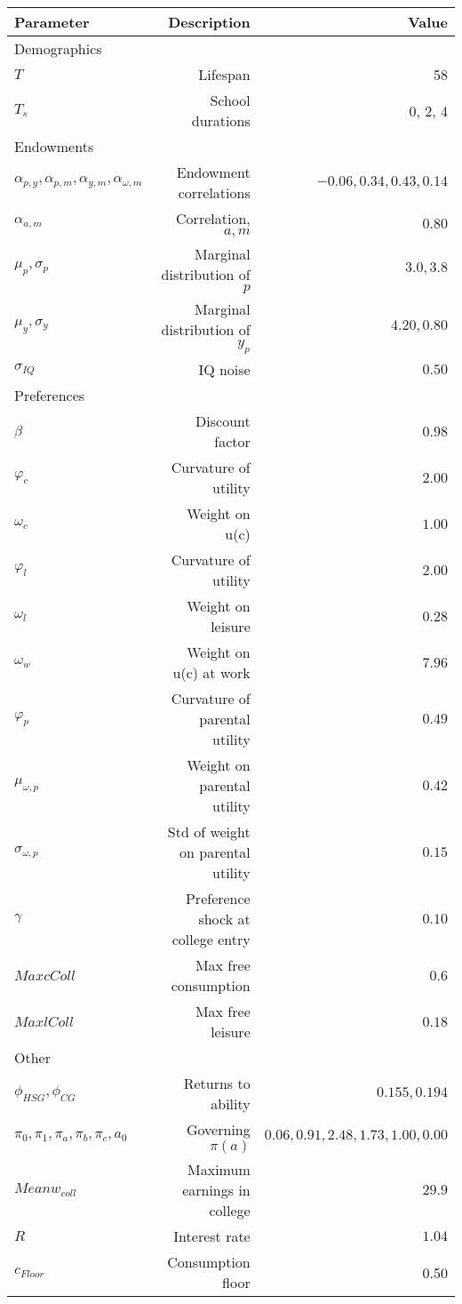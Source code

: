 \begin{tabular}{lrr}
\hline
Parameter & Description  & Value  \\
\hline
Demographics &   &   \\
$T$ & Lifespan  & 58  \\
$T_{s}$ & School durations  & 0, 2, 4  \\
Endowments &   &   \\
$\alpha_{p,y}, \alpha_{p,m}, \alpha_{y,m}, \alpha_{\omega,m}$ & Endowment correlations  & $-0.06, 0.34, 0.43, 0.14$  \\
$\alpha_{a,m}$ & Correlation, $a,m$  & $0.80$  \\
$\mu_{p}, \sigma_{p}$ & Marginal distribution of $p$  & $3.0, 3.8$  \\
$\mu_{y}, \sigma_{y}$ & Marginal distribution of $y_{p}$  & $4.20, 0.80$  \\
$\sigma_{IQ}$ & IQ noise  & $0.50$  \\
Preferences &   &   \\
$\beta$ & Discount factor  & $0.98$  \\
$\varphi_{c}$ & Curvature of utility  & $2.00$  \\
$\omega_{c}$ & Weight on u(c)  & $1.00$  \\
$\varphi_{l}$ & Curvature of utility  & $2.00$  \\
$\omega_{l}$ & Weight on leisure  & $0.28$  \\
$\omega_{w}$ & Weight on u(c) at work  & $7.96$  \\
$\varphi_{p}$ & Curvature of parental utility  & $0.49$  \\
$\mu_{\omega,p}$ & Weight on parental utility  & $0.42$  \\
$\sigma_{\omega,p}$ & Std of weight on parental utility  & $0.15$  \\
$\gamma$ & Preference shock at college entry  & $0.10$  \\
$Max cColl$ & Max free consumption  & $0.6$  \\
$Max lColl$ & Max free leisure  & $0.18$  \\
Other &   &   \\
$\phi_{HSG}, \phi_{CG}$ & Returns to ability  & $0.155, 0.194$  \\
$\pi_{0}, \pi_{1}, \pi_{a}, \pi_{b}, \pi_{c}, a_{0}$ & Governing $\pi(a)$  & $0.06, 0.91, 2.48, 1.73, 1.00, 0.00$  \\
$Mean w_{coll}$ & Maximum earnings in college  & $29.9$  \\
$R$ & Interest rate  & $1.04$  \\
$c_{Floor}$ & Consumption floor  & 0.50  \\
\hline
\end{tabular}%

